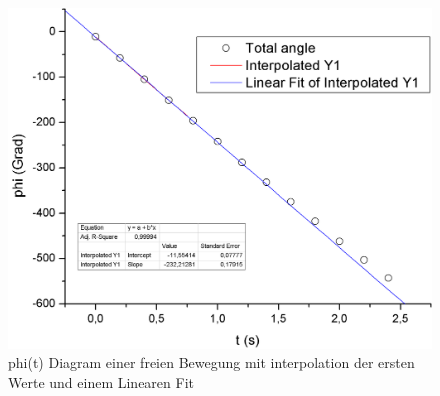 \documentclass[12pt,a4paper]{article}
\begin{document}
\begin{multicols}{2}




%			
%


\begin{figure}[H]
	\centering
	\includegraphics[scale=0.3]{./figure/phi(t)_diagram_freie_bew.png}
	\caption{phi(t) Diagram einer freien Bewegung mit interpolation der ersten Werte und einem Linearen Fit}
	\label{fig:phi_t_freie_bew}
\end{figure}


\end{multicols}
\end{document}
